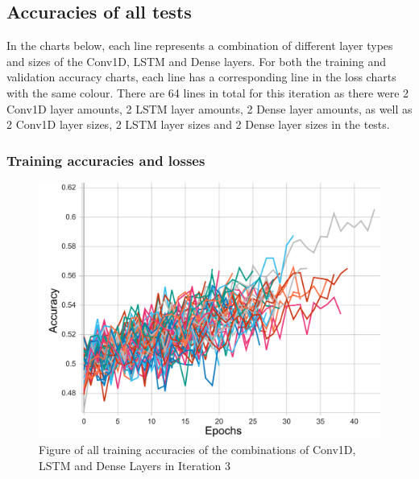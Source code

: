 \subsection{Accuracies of all tests}
In the charts below, each line represents a combination of different layer types and sizes of the Conv1D, LSTM and Dense layers.
For both the training and validation accuracy charts, each line has a corresponding line in the loss charts with the same colour.
There are 64 lines in total for this iteration as there were 2 Conv1D layer amounts, 2 LSTM layer amounts, 2 Dense layer amounts,
as well as 2 Conv1D layer sizes, 2 LSTM layer sizes and 2 Dense layer sizes in the tests.

\subsubsection{Training accuracies and losses}
\begin{figure}[ht]
    \centering
    \includegraphics[width=0.95\columnwidth]{figures/results/cnnlstm/cnnlstm_all_acc_t.pdf}
    \caption[Training accuracies for Iteration 3]{Figure of all training accuracies of the combinations of Conv1D, LSTM and Dense Layers in Iteration 3}
    \label{fig:iteration3_train_accuracy}
\end{figure}
\FloatBarrier

